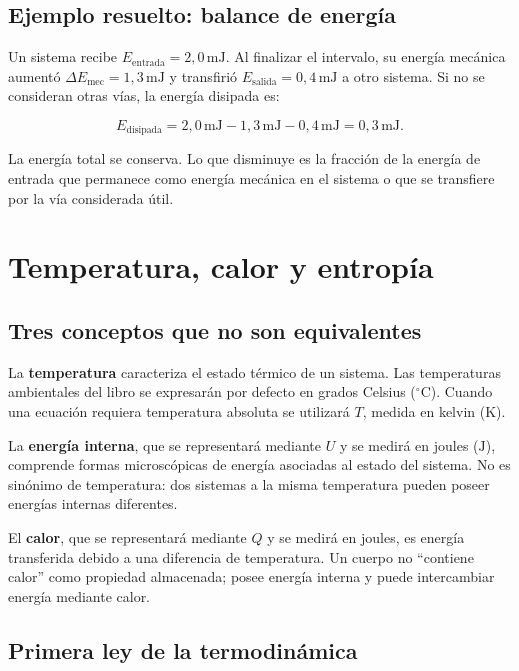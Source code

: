 \subsection{Ejemplo resuelto: balance de energía}
\label{sec:u2-ejemplo-energia}

Un sistema recibe \(E_\mathrm{entrada}=2{,}0\,\text{mJ}\). Al finalizar el intervalo, su energía mecánica aumentó \(\Delta E_\mathrm{mec}=1{,}3\,\text{mJ}\) y transfirió \(E_\mathrm{salida}=0{,}4\,\text{mJ}\) a otro sistema. Si no se consideran otras vías, la energía disipada es:

\[
    E_\mathrm{disipada}
    =2{,}0\,\text{mJ}-1{,}3\,\text{mJ}-0{,}4\,\text{mJ}
    =0{,}3\,\text{mJ}.
\]

La energía total se conserva. Lo que disminuye es la fracción de la energía de entrada que permanece como energía mecánica en el sistema o que se transfiere por la vía considerada útil.

\section{Temperatura, calor y entropía}
\label{sec:u2-termodinamica}

\subsection{Tres conceptos que no son equivalentes}
\label{sec:u2-temperatura-calor-interna}

La \textbf{temperatura} caracteriza el estado térmico de un sistema. Las temperaturas ambientales del libro se expresarán por defecto en grados Celsius (\(^{\circ}\text{C}\)). Cuando una ecuación requiera temperatura absoluta se utilizará \(T\), medida en kelvin (\(\text{K}\)).

La \textbf{energía interna}, que se representará mediante \(U\) y se medirá en joules (\(\text{J}\)), comprende formas microscópicas de energía asociadas al estado del sistema. No es sinónimo de temperatura: dos sistemas a la misma temperatura pueden poseer energías internas diferentes.

El \textbf{calor}, que se representará mediante \(Q\) y se medirá en joules, es energía transferida debido a una diferencia de temperatura. Un cuerpo no ``contiene calor'' como propiedad almacenada; posee energía interna y puede intercambiar energía mediante calor.

\subsection{Primera ley de la termodinámica}
\label{sec:u2-primera-ley-termodinamica}

